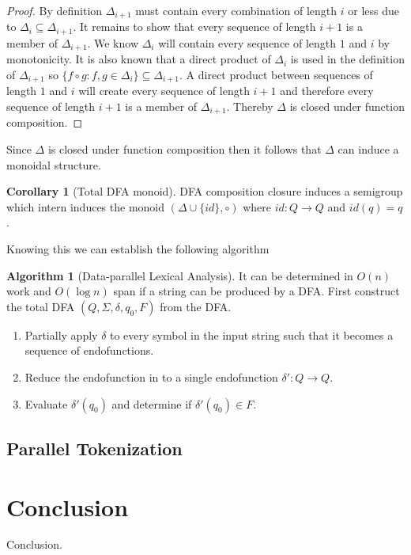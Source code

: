 \documentclass[a4paper,12pt]{article}
\theoremstyle{definition}
\newtheorem{corollary}{Corollary}[section]
\newtheorem{algorithm}{Algorithm}[section]
\begin{document}
\begin{proof}
  By definition $\Delta_{i + 1}$ must contain every combination of length $i$ or less due to $\Delta_i \subseteq \Delta_{i + 1}$. It remains to show that every sequence of length $i + 1$ is a member of $\Delta_{i + 1}$. We know $\Delta_i$ will contain every sequence of length $1$ and $i$ by monotonicity. It is also known that a direct product of $\Delta_i$ is used in the definition of $\Delta_{i + 1}$ so $\{f \circ g : f, g \in \Delta_i\} \subseteq \Delta_{i + 1}$. A direct product between sequences of length $1$ and $i$ will create every sequence of length $i + 1$ and therefore every sequence of length $i + 1$ is a member of $\Delta_{i + 1}$. Thereby $\Delta$ is closed under function composition.
\end{proof}
\noindent Since $\Delta$ is closed under function composition then it follows that $\Delta$ can induce a monoidal structure.

\begin{corollary}[Total DFA monoid]
  DFA composition closure induces a semigroup which intern induces the monoid $(\Delta \cup \{id\}, \circ)$ where $id: Q \to Q$ and $id(q) = q$.
\end{corollary}
\noindent Knowing this we can establish the following algorithm
\begin{algorithm}[Data-parallel Lexical Analysis]
  It can be determined in $O(n)$ work and $O(\log n)$ span if a string can be produced by a DFA. First construct the total DFA $(Q, \Sigma, \delta, q_0, F)$ from the DFA.
  \begin{enumerate}
    \item Partially apply $\delta$ to every symbol in the input string such that it becomes a sequence of endofunctions.
    \item Reduce the endofunction in to a single endofunction $\delta': Q \to Q$.
    \item Evaluate $\delta'(q_0)$ and determine if $\delta'(q_0) \in F$.
  \end{enumerate}
\end{algorithm}

\subsection{Parallel Tokenization}



\section{Conclusion}
Conclusion.
\printbibliography
\end{document}
